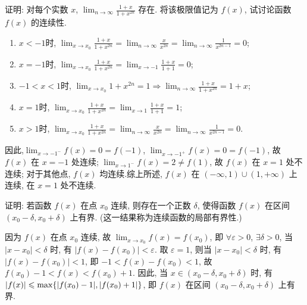 \begin{exercise}[2.1.9]
    证明: 对每个实数 $x$, $\lim_{n \to \infty} \frac{1+x}{1+x^{2n}}$ 存在. 将该极限值记为 $f(x)$, 试讨论函数 $f(x)$ 的连续性.
\end{exercise}

\begin{solution}
    \begin{enumerate}[(\alph*)]
        \item $x < -1$时, $\lim_{x \to x_0} \frac{1+x}{1+x^{2n}} = \lim_{n \to \infty} \frac{x}{x^{2n}} = \lim_{n \to \infty} \frac{1}{x^{2n-1}} = 0$;
        \item $x = -1$时, $\lim_{x \to x_0} \frac{1+x}{1+x^{2n}} = \lim_{x \to -1} \frac{1+x}{1+1} = 0$;
        \item $-1 < x < 1$时, $\lim_{x \to x_0} 1 + x^{2n} = 1 \Rightarrow \lim_{n \to \infty} \frac{1+x}{1+x^{2n}} = 1 + x$;
        \item $x = 1$时, $\lim_{x \to x_0} \frac{1+x}{1+x^{2n}} = \lim_{x \to 1} \frac{1+x}{1+1} = 1$;
        \item $x > 1$时, $\lim_{x \to x_0} \frac{1+x}{1+x^{2n}} = \lim_{n \to \infty} \frac{x}{x^{2n}} = \lim_{n \to \infty} \frac{1}{x^{2n-1}} = 0$.
    \end{enumerate}
    因此,$\lim_{x \to -1^-} f(x) = 0 = f(-1)$, $\lim_{x \to -1^+} f(x) = 0 = f(-1)$, 故 $f(x)$ 在 $x=-1$ 处连续; $\lim_{x \to 1^-} f(x) = 2 \ne f(1)$, 故 $f(x)$ 在 $x=1$ 处不连续; 对于其他点, $f(x)$ 均连续.综上所述, $f(x)$ 在 $(-\infty, 1) \cup (1, +\infty)$ 上连续, 在 $x=1$ 处不连续.
\end{solution}

\begin{exercise}[2.1.10]
    证明: 若函数 $f(x)$ 在点 $x_0$ 连续, 则存在一个正数 $\delta$, 使得函数 $f(x)$ 在区间 $(x_0-\delta, x_0+\delta)$ 上有界. (这一结果称为连续函数的局部有界性.)
\end{exercise}

\begin{solution}
    因为 $f(x)$ 在点 $x_0$ 连续, 故 $\lim_{x \to x_0} f(x) = f(x_0)$, 即 $\forall \varepsilon > 0$, $\exists \delta > 0$, 当 $|x-x_0| < \delta$ 时, 有 $|f(x)-f(x_0)| < \varepsilon$. 取 $\varepsilon = 1$, 则当 $|x-x_0| < \delta$ 时, 有 $|f(x)-f(x_0)| < 1$, 即 $-1 < f(x)-f(x_0) < 1$, 故 $f(x_0)-1 < f(x) < f(x_0)+1$. 因此, 当 $x \in (x_0-\delta, x_0+\delta)$ 时, 有 $|f(x)| \leqslant \max\{|f(x_0)-1|, |f(x_0)+1|\}$, 即 $f(x)$ 在区间 $(x_0-\delta, x_0+\delta)$ 上有界.
\end{solution}

